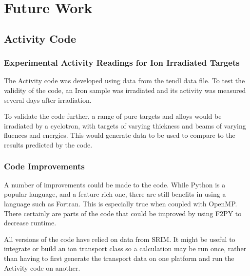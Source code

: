 \chapter{Future Work}
\label{chapter:futurework}

\begin{changemargin}{1.0cm}{1.0cm} 
\end{changemargin}


\section{Activity Code}

\subsection{Experimental Activity Readings for Ion Irradiated Targets}

The Activity code was developed using data from the \acrshort{tendl} data file.  To test the validity of the code, an Iron sample was irradiated and its activity was measured several days after irradiation.

To validate the code further, a range of pure targets and alloys would be irradiated by a cyclotron, with targets of varying thickness and beams of varying fluences and energies.  This would generate data to be used to compare to the results predicted by the code.  


\subsection{Code Improvements}

A number of improvements could be made to the code.  While Python is a popular language, and a feature rich one, there are still benefits in using a language such as Fortran.  This is especially true when coupled with OpenMP.  There certainly are parts of the code that could be improved by using F2PY to decrease runtime.

All versions of the code have relied on data from SRIM.  It might be useful to integrate or build an ion transport class so a calculation may be run once, rather than having to first generate the transport data on one platform and run the Activity code on another.  

